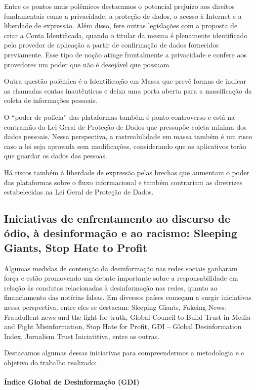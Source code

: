 Entre os pontos mais polêmicos destacamos o potencial prejuízo aos
direitos fundamentais como a privacidade, a proteção de dados, o acesso
à Internet e a liberdade de expressão. Além disso, fere outras
legislações com a proposta de criar a Conta Identificada, quando o
titular da mesma é plenamente identificado pelo provedor de aplicação a
partir de confirmação de dados fornecidos previamente. Esse tipo de
noção atinge frontalmente a privacidade e confere aos provedores um
poder que não é desejável que possuam.

Outra questão polêmica é a Identificação em Massa que prevê formas de
indicar as chamadas contas inautênticas e deixa uma porta aberta para a
massificação da coleta de informações pessoais.

O ``poder de polícia'' das plataformas também é ponto controverso e está
na contramão da Lei Geral de Proteção de Dados que pressupõe coleta
mínima dos dados pessoais. Nessa perspectiva, a rastreabilidade em massa
também é um risco caso a lei seja aprovada sem modificações,
considerando que os aplicativos terão que guardar os dados das pessoas.

Há riscos também à liberdade de expressão pelas brechas que aumentam o
poder das plataformas sobre o fluxo informacional e também contrariam as
diretrizes estabelecidas na Lei Geral de Proteção de Dados.

\subsection{Iniciativas de enfrentamento ao discurso de ódio, à
desinformação e ao racismo: Sleeping Giants, Stop Hate to
Profit}

Algumas medidas de contenção da desinformação nas redes sociais ganharam
força e estão promovendo um debate importante sobre a responsabilidade
em relação às condutas relacionadas à desinformação nas redes, quanto ao
financiamento das notícias falsas. Em diversos países começam a surgir
iniciativas nessa perspectiva, entre eles se destacam: Sleeping Giants,
Fakeing News: Fraudullent news and the fight for truth, Global Council
to Build Trust in Media and Fight Misinformation, Stop Hate for Profit,
GDI -- Global Desinformation Index, Jornalism Trust Iniciatitiva, entre
as outras.

Destacamos algumas dessas iniciativas para compreendermos a metodologia
e o objetivo do trabalho realizado:

\paragraph{Índice Global de Desinformação (GDI)}

